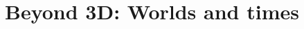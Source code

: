\documentclass{kvf-tufte-VDQI}
\begin{document}
\dominitoc


\mainmatter

\nopartblankpage
\part{Beyond 3D: Worlds and times}







% 
% 


% 


% 

\backmatter

\printbibliography[heading=bibliographypart]
\end{document}
